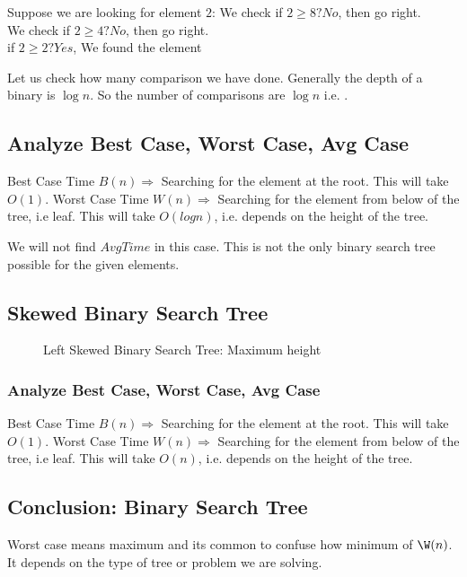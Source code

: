 \documentclass{article}
\begin{document}
Suppose we are looking for element $2$:
We check if $2 \geq 8 ? No$, then go right.\\
We check if $2 \geq 4 ? No$, then go right.\\
if $2 \geq 2 ? Yes $, We found the element

Let us check how many comparison we have done. 
Generally the depth of a binary is $\log{n}$. So the number of comparisons are $\log{n}$ i.e. .

\subsection{Analyze Best Case, Worst Case, Avg Case}
Best Case Time $B(n) \Longrightarrow $ Searching for the element at the root. This will take $O(1)$.
Worst Case Time $W(n) \Longrightarrow $ Searching for the element from below of the tree, i.e leaf. This will take $O(log{n})$, i.e. depends on the height of the tree.

We will not find $AvgTime$ in this case.
This is not the only binary search tree possible for the given elements.

\subsection{Skewed Binary Search Tree}
\begin{figure}[H]
    \centering
    \caption{Left Skewed Binary Search Tree: Maximum height}
\end{figure}

\subsubsection{Analyze Best Case, Worst Case, Avg Case}
Best Case Time $B(n) \Longrightarrow $ Searching for the element at the root. This will take $O(1)$.
Worst Case Time $W(n) \Longrightarrow $ Searching for the element from below of the tree, i.e leaf. This will take $O(n)$, i.e. depends on the height of the tree.

\subsection{Conclusion: Binary Search Tree}

Worst case means maximum and its common to confuse how minimum of $\W(n)$. It depends on the type of tree or problem we are solving.
\end{document}
